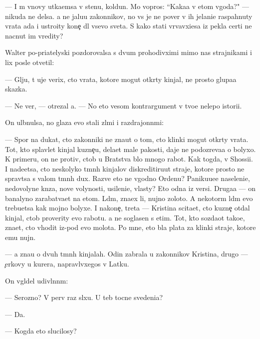 \documentclass[10pt]{book}
\begin{document}
— I m{\yi} vnovy ut{\yi}ka{\y}emsa v stenu, koldun. Mo{\y} vopros: ``Kaka{\y}a v etom v{\yi}goda?" — nikuda ne delsa. {\Y}a ne jalu{\y}u zakonnikov, no vs{\e} je ne pover{\iu} v ih jelani{\y}e raspahnuty vrata ada i ustro{\y}ity kone{\c} dl{\ia} vsevo sveta. S kako{\y} stati v{\yi}rvavxi{\y}esa iz pekla certi ne nacnut im vredity?

Walter po-pri{\y}atelyski pozdorovalsa s dvum{\ia} prohodivximi mimo nas strajnikami i lix posle otvetil:

— Gl{\ia}ju, t{\yi} uje verix, cto vrata, kotor{\yi}{\y}e mogut otkr{\yi}ty kinjal{\yi}, ne prosto glupa{\y}a skazka.

— Ne ver{\iu}, — otrezal {\y}a. — No eto vesom{\yi}{\y} kontrargument v tvo{\y}e{\y} nelepo{\y} istori{\y}i.

On ul{\yi}bnulsa, no glaza {\y}evo stali zl{\yi}mi i razdrajonn{\yi}mi:

— Spor{\iu} na dukat, cto zakonniki ne zna{\y}ut o tom, cto klinki mogut otkr{\yi}ty vrata. Tot, kto splavl{\ia}{\y}et kinjal{\yi} kuzne{\c}u, dela{\y}et mal{\yi}{\y}e pakosti, daje ne podozreva{\y}a o bolyxo{\y}. K primeru, on ne protiv, ctob{\yi} u Bratstva b{\yi}lo mnogo rabot{\yi}. Kak togda, v Shossi{\y}i. I nade{\y}etsa, cto neskolyko t{\e}mn{\yi}h kinjalov diskreditiru{\y}ut straje{\y}, kotor{\yi}{\y}e prosto ne sprav{\ia}tsa s valom t{\e}mn{\yi}h dux. Razve eto ne v{\yi}godno Ordenu? Paniku{\y}u{\x}e{\y}e naseleni{\y}e, nedovolyn{\yi}{\y}e kn{\ia}z{\y}a, nov{\yi}{\y}e volynosti, usileni{\y}e, vlasty? Eto odna iz versi{\y}. Druga{\y}a — on banalyno zarabat{\yi}va{\y}et na etom. L{\iu}d{\ia}m, zna{\y}ex li, nujno zoloto. A nekotor{\yi}m l{\iu}d{\ia}m {\y}evo trebu{\y}etsa kak mojno bolyxe. I nakone{\c}, tret{\y}a — Kristina scita{\y}et, cto kuzne{\c} otdal kinjal, ctob{\yi} proverity {\y}evo rabotu. {\Y}a ne soglasen s etim. Tot, kto sozda{\y}ot tako{\y}e, zna{\y}et, cto v{\yi}hodit iz-pod {\y}evo molota. Po mne, eto b{\yi}la plata za klinki straje{\y}, kotor{\yi}{\y}e {\y}emu nujn{\yi}.

— {\Y}a zna{\y}u o dvuh t{\e}mn{\yi}h kinjalah. Odin zabrala u zakonnikov Kristina, drugo{\y} — {\c}erkovy u kur{\y}era, napravl{\ia}vxegos{\ia} v Latku.

On v{\yi}gl{\ia}del udivl{\e}nn{\yi}m:

— Ser{\y}ozno? V perv{\yi}{\y} raz sl{\yi}xu. U teb{\ia} tocn{\yi}{\y}e svedeni{\y}a?

— Da.

— Kogda eto slucilosy?
\end{document}
